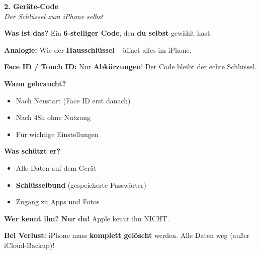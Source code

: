 \documentclass[a4paper,landscape,8pt]{extarticle}
\begin{document}
\hfill%
\begin{minipage}[t]{0.32\linewidth}
\begin{center}
\colorbox{devicegreen!10}{%
\begin{minipage}{0.95\linewidth}
\vspace{2mm}
\begin{center}
{\Large\bfseries\textcolor{devicegreen}{2. Geräte-Code}}\\[1pt]
{\footnotesize\itshape Der Schlüssel zum iPhone selbst}
\end{center}
\vspace{2mm}
\end{minipage}%
}
\end{center}

\vspace{1mm}

\textbf{Was ist das?} Ein \textbf{6-stelliger Code}, den \textbf{du selbst} gewählt hast.

\textbf{Analogie:} Wie der \textbf{Hausschlüssel} -- öffnet alles im iPhone.

\textbf{Face ID / Touch ID:} Nur \textbf{Abkürzungen}! Der Code bleibt der echte Schlüssel.

\textbf{Wann gebraucht?}
\begin{itemize}
\item Nach Neustart (Face ID erst danach)
\item Nach 48h ohne Nutzung
\item Für wichtige Einstellungen
\end{itemize}

\textbf{Was schützt er?}
\begin{itemize}
\item Alle Daten auf dem Gerät
\item \textbf{Schlüsselbund} (gespeicherte Passwörter)
\item Zugang zu Apps und Fotos
\end{itemize}

\textbf{Wer kennt ihn?} \textbf{Nur du!} Apple kennt ihn NICHT.

\textbf{Bei Verlust:} iPhone muss \textbf{komplett gelöscht} werden. Alle Daten weg (außer iCloud-Backup)!

\end{minipage}%
\hfill%
\end{document}
